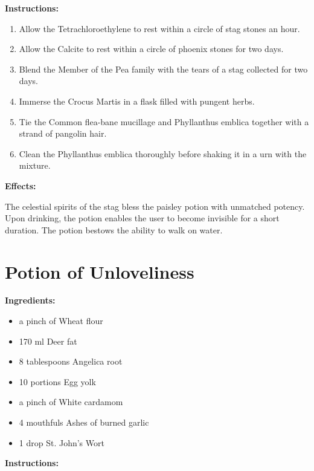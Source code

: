 \documentclass{article}
\begin{document}
\textbf{Instructions:}

\begin{enumerate}
  \item Allow the Tetrachloroethylene to rest within a circle of stag stones an hour.
  \item Allow the Calcite to rest within a circle of phoenix stones for two days.
  \item Blend the Member of the Pea family with the tears of a stag collected for two days.
  \item Immerse the Crocus Martis in a flask filled with pungent herbs.
  \item Tie the Common flea-bane mucillage and Phyllanthus emblica together with a strand of pangolin hair.
  \item Clean the Phyllanthus emblica thoroughly before shaking it in a urn with the mixture.
\end{enumerate}

\textbf{Effects:}

The celestial spirits of the stag bless the paisley potion with unmatched potency. Upon drinking, the potion enables the user to become invisible for a short duration. The potion bestows the ability to walk on water.

\newpage
\section*{Potion of Unloveliness}

\textbf{Ingredients:}

\begin{itemize}
  \item a pinch of Wheat flour
  \item 170 ml Deer fat
  \item 8 tablespoons Angelica root
  \item 10 portions Egg yolk
  \item a pinch of White cardamom
  \item 4 mouthfuls Ashes of burned garlic
  \item 1 drop St. John's Wort
\end{itemize}

\textbf{Instructions:}
\end{document}
